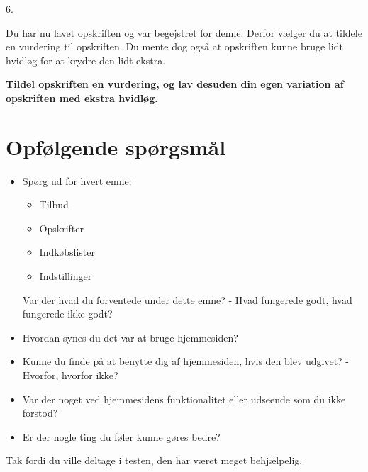 6.

Du har nu lavet opskriften og var begejstret for denne. Derfor vælger du at tildele en vurdering til opskriften.
Du mente dog også at opskriften kunne bruge lidt hvidløg for at krydre den lidt ekstra.

\textbf{Tildel opskriften en vurdering, og lav desuden din egen variation af opskriften med ekstra hvidløg.}


\section{Opfølgende spørgsmål}

\begin{itemize}
	\item Spørg ud for hvert emne:
		\begin{itemize}
			\item Tilbud
			\item Opskrifter
			\item Indkøbslister
			\item Indstillinger
		\end{itemize}
	Var der hvad du forventede under dette emne? - Hvad fungerede godt, hvad fungerede ikke godt?
	\item Hvordan synes du det var at bruge hjemmesiden?
	\item Kunne du finde på at benytte dig af hjemmesiden, hvis den blev udgivet? - Hvorfor, hvorfor ikke?
	\item Var der noget ved hjemmesidens funktionalitet eller udseende som du ikke forstod?
	\item Er der nogle ting du føler kunne gøres bedre?
\end{itemize}

Tak fordi du ville deltage i testen, den har været meget behjælpelig.

